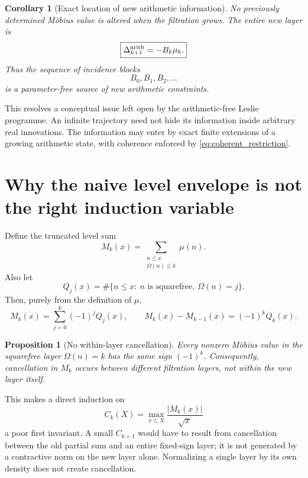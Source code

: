 \documentclass[11pt]{amsart}
\numberwithin{equation}{section}
\theoremstyle{plain}
\newtheorem{proposition}[theorem]{Proposition}
\newtheorem{corollary}[theorem]{Corollary}
\theoremstyle{definition}
\theoremstyle{remark}
\begin{document}
\begin{corollary}[Exact location of new arithmetic information]
\label{cor:new_arithmetic_information}
No previously determined M\"obius value is altered when the filtration grows.  The entire new
layer is
\begin{equation}
\boxed{\Delta_{k+1}^{\rm arith}=-B_k\mu_k.}
\label{eq:new_arithmetic_layer}
\end{equation}
Thus the sequence of incidence blocks
\[
B_0,B_1,B_2,\ldots
\]
is a parameter-free source of new arithmetic constraints.
\end{corollary}

This resolves a conceptual issue left open by the arithmetic-free Leslie programme.  An infinite
trajectory need not hide its information inside arbitrary real innovations.  The information may
enter by exact finite extensions of a growing arithmetic state, with coherence enforced by
\eqref{eq:coherent_restriction}.


\section{Why the naive level envelope is not the right induction variable}
\label{sec:omega_envelope_obstruction}

Define the truncated level sum
\begin{equation}
M_k(x)
=
\sum_{\substack{n\le x\\\Omega(n)\le k}}\mu(n).
\label{eq:Mk_level}
\end{equation}
Also let
\begin{equation}
Q_j(x)
=
\#\{n\le x:\ n\text{ is squarefree},\ \Omega(n)=j\}.
\label{eq:Qj_squarefree}
\end{equation}
Then, purely from the definition of $\mu$,
\begin{equation}
M_k(x)=
\sum_{j=0}^k(-1)^jQ_j(x),
\qquad
M_k(x)-M_{k-1}(x)=(-1)^kQ_k(x).
\label{eq:Mk_layer_decomposition}
\end{equation}

\begin{proposition}[No within-layer cancellation]
\label{prop:no_within_layer_cancellation}
Every nonzero M\"obius value in the squarefree layer $\Omega(n)=k$ has the same sign $(-1)^k$.
Consequently, cancellation in $M_k$ occurs between different filtration layers, not within the
new layer itself.
\end{proposition}

This makes a direct induction on
\[
C_k(X)=
\max_{x\le X}\frac{|M_k(x)|}{\sqrt x}
\]
a poor first invariant.  A small $C_{k+1}$ would have to result from cancellation between the
old partial sum and an entire fixed-sign layer; it is not generated by a contractive norm on the
new layer alone.  Normalizing a single layer by its own density does not create cancellation.
\end{document}
